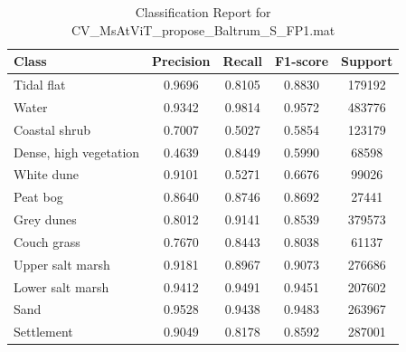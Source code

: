 \begin{table}[H]
    \centering
    \caption{Classification Report for CV\_MsAtViT\_propose\_Baltrum\_S\_FP1.mat}
    \begin{tabular}{lcccc}
        \toprule
        Class & Precision & Recall & F1-score & Support \\
        \midrule
        Tidal flat & 0.9696 & 0.8105 & 0.8830 & 179192 \\
        Water & 0.9342 & 0.9814 & 0.9572 & 483776 \\
        Coastal shrub & 0.7007 & 0.5027 & 0.5854 & 123179 \\
        Dense, high vegetation & 0.4639 & 0.8449 & 0.5990 & 68598 \\
        White dune & 0.9101 & 0.5271 & 0.6676 & 99026 \\
        Peat bog & 0.8640 & 0.8746 & 0.8692 & 27441 \\
        Grey dunes & 0.8012 & 0.9141 & 0.8539 & 379573 \\
        Couch grass & 0.7670 & 0.8443 & 0.8038 & 61137 \\
        Upper salt marsh & 0.9181 & 0.8967 & 0.9073 & 276686 \\
        Lower salt marsh & 0.9412 & 0.9491 & 0.9451 & 207602 \\
        Sand & 0.9528 & 0.9438 & 0.9483 & 263967 \\
        Settlement & 0.9049 & 0.8178 & 0.8592 & 287001 \\
        \bottomrule
    \end{tabular}
    \label{tab:CV_MsAtViT_propose_Baltrum_S_FP1_mat}
\end{table}

